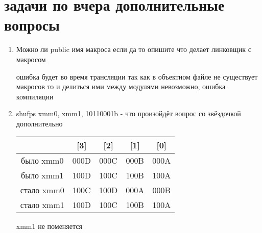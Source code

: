 \documentclass[a4paper,10pt]{article}
\begin{document}
\section*{задачи по вчера дополнительные вопросы}
\begin{enumerate}
    \item Можно ли public имя макроса если да то опишите что делает линковщик с макросом \par
    ошибка будет во время трансляции так как в объектном файле не существует макросов то и делиться ими между модулями невозможно, ошибка компиляции
    \item shufps xmm0, xmm1, 10110001b - что произойдёт вопрос со звёздочкой дополнительно\\
    \begin{tabular}{|c|c|c|c|c|}
        \hline
        & [3] & [2] & [1] & [0] \\
     \hline
     было xmm0 & 000D & 000C & 000B & 000A \\
     \hline
     было xmm1 & 100D & 100C & 100B & 100A \\
     \hline
     стало xmm0 & 100C & 100D & 000A & 000B \\
     \hline
     стало xmm1 & 100D & 100C & 100B & 100A \\
     \hline
    \end{tabular}
    xmm1 не поменяется
\end{enumerate}
\end{document}
